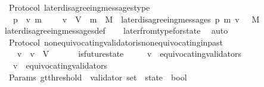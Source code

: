 \begin{isabellebody}
\isanewline
{}\isamarkupfalse%
\ {\isacharparenleft}\ Protocol{\isacharparenright}\ later{\isacharunderscore}disagreeing{\isacharunderscore}messages{\isacharunderscore}type\ {\isacharcolon}\isanewline
\ \ {\isachardoublequoteopen}{\isasymforall}\ p\ {\isasymsigma}\ v\ m{\isachardot}\ {\isasymsigma}\ {\isasymin}\ {\isasymSigma}\ {\isasymand}\ v\ {\isasymin}\ V\ {\isasymand}\ m\ {\isasymin}\ M\ {\isasymlongrightarrow}\ later{\isacharunderscore}disagreeing{\isacharunderscore}messages\ {\isacharparenleft}p{\isacharcomma}\ m{\isacharcomma}\ v{\isacharcomma}\ {\isasymsigma}{\isacharparenright}\ {\isasymsubseteq}\ M{\isachardoublequoteclose}\isanewline
%
\isadelimproof
\ \ %
\endisadelimproof
%
\isatagproof
{}\isamarkupfalse%
\ later{\isacharunderscore}disagreeing{\isacharunderscore}messages{\isacharunderscore}def\isanewline
\ \ \isamarkupfalse%
\ later{\isacharunderscore}from{\isacharunderscore}type{\isacharunderscore}for{\isacharunderscore}state\ \isamarkupfalse%
\ auto%
\endisatagproof
{\isafoldproof}%
%
\isadelimproof
\isanewline
%
\endisadelimproof
\isanewline
\isanewline
\isanewline
\isanewline
{}\isamarkupfalse%
\ {\isacharparenleft}\ Protocol{\isacharparenright}\ non{\isacharunderscore}equivocating{\isacharunderscore}validator{\isacharunderscore}is{\isacharunderscore}non{\isacharunderscore}equivocating{\isacharunderscore}in{\isacharunderscore}past\ {\isacharcolon}\isanewline
\ \ {\isachardoublequoteopen}{\isasymforall}\ {\isasymsigma}\ v\ {\isasymsigma}{\isacharprime}{\isachardot}\ v\ {\isasymin}\ V\ {\isasymand}\ {\isacharbraceleft}{\isasymsigma}{\isacharcomma}\ {\isasymsigma}{\isacharprime}{\isacharbraceright}\ {\isasymsubseteq}\ {\isasymSigma}\ {\isasymand}\ is{\isacharunderscore}future{\isacharunderscore}state\ {\isacharparenleft}{\isasymsigma}{\isacharprime}{\isacharcomma}\ {\isasymsigma}{\isacharparenright}\isanewline
\ \ {\isasymlongrightarrow}\ v\ {\isasymnotin}\ equivocating{\isacharunderscore}validators\ {\isasymsigma}\isanewline
\ \ {\isasymlongrightarrow}\ v\ {\isasymnotin}\ equivocating{\isacharunderscore}validators\ {\isasymsigma}{\isacharprime}{\isachardoublequoteclose}\isanewline
\ \ \isanewline
%
\isadelimproof
\ \ %
\endisadelimproof
%
\isatagproof
{}\isamarkupfalse%
%
\endisatagproof
{\isafoldproof}%
%
\isadelimproof
\isanewline
%
\endisadelimproof
\isanewline
\ \isanewline
\isanewline
{}\isamarkupfalse%
\ {\isacharparenleft}\ Params{\isacharparenright}\ gt{\isacharunderscore}threshold\ {\isacharcolon}{\isacharcolon}\ {\isachardoublequoteopen}{\isacharparenleft}validator\ set\ {\isacharasterisk}\ state{\isacharparenright}\ {\isasymRightarrow}\ bool{\isachardoublequoteclose}\isanewline

\end{isabellebody}
